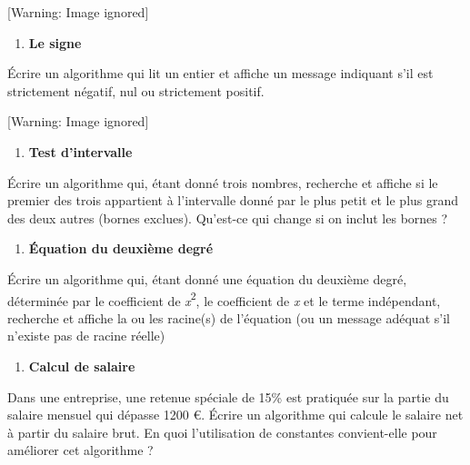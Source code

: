 \begin{center}
 [Warning: Image ignored] %

\end{center}
\liststyleExercice
\setcounter{saveenum}{\value{enumi}}
\begin{enumerate}
\setcounter{enumi}{\value{saveenum}}
\item {\sffamily\bfseries
Le signe}
\end{enumerate}
{
Écrire un algorithme qui lit un entier et affiche un message indiquant
s'il est strictement négatif, nul ou strictement
positif. }

\begin{center}
 [Warning: Image ignored] %

\end{center}
\liststyleExercice
\setcounter{saveenum}{\value{enumi}}
\begin{enumerate}
\setcounter{enumi}{\value{saveenum}}
\item {\sffamily\bfseries
Test d'intervalle}
\end{enumerate}
{
Écrire un algorithme qui, étant donné trois nombres, recherche et
affiche si le premier des trois appartient à l’intervalle donné par le
plus petit et le plus grand des deux autres (bornes exclues). Qu’est-ce
qui change si on inclut les bornes ?}

\liststyleExercice
\setcounter{saveenum}{\value{enumi}}
\begin{enumerate}
\setcounter{enumi}{\value{saveenum}}
\item {\sffamily\bfseries
Équation du deuxième degré}
\end{enumerate}
{
{Écrire un algorithme qui, étant donné une
équation du deuxième degré, déterminée par le coefficient de
}{\textit{x}}{\textsuperscript{2}}{,
le coefficient de
}{\textit{x}}{ et le
terme indépendant, recherche et affiche la ou les racine(s) de
l’équation (ou un message adéquat s'il
n'existe pas de racine réelle) }}

\liststyleExercice
\setcounter{saveenum}{\value{enumi}}
\begin{enumerate}
\setcounter{enumi}{\value{saveenum}}
\item {\sffamily\bfseries
Calcul de salaire}
\end{enumerate}
{
Dans une entreprise, une retenue spéciale de 15\% est pratiquée sur la
partie du salaire mensuel qui dépasse 1200 €. Écrire un algorithme qui
calcule le salaire net à partir du salaire brut. En quoi l’utilisation
de constantes convient-elle pour améliorer cet algorithme ?}

